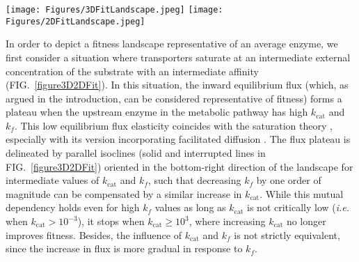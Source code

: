 \documentclass[11pt,onecolumn]{article}
\begin{document}
\begin{figure*}[t!]
\centering
\texttt{[image: Figures/3DFitLandscape.jpeg]}
\texttt{[image: Figures/2DFitLandscape.jpeg]}
\caption{The flux of product following substrate uptake by transporters and conversion by a dedicated enzyme depends on the kinetic parameters $k_f$ and $k_\text{cat}$ of the enzyme. This landscape is generic in the sense that we avoid focusing on sugars -- arguably extreme cases in terms of flux intensity -- for a general description, considering a moderate flux at saturation $V_{Tm}=1 \mu M.s^{-1}$ close to those measured for amino acids and nucleosides in E.\textit{coli} \citep{Zampieri2019}. We also set the transport saturation ratio $[S_\text{out}]/K_\text{T}$ to 10 such that the FD process approaches saturation, and high transporter affinity $K_\text{T}=50\mu M$, also in line with estimates for nucleosides \citep{Griffith96,Xie04} (see Material and Methods). Other parameter values include $k_r=10^3s^{-1}$ and $[E_{tot}]=1mM$. The color gradient shows the absolute and normalized (such that the maximum flux equals $1$) values of equilibrium flux.}
\label{figure3D2DFit}
\end{figure*}

In order to depict a fitness landscape representative of an average enzyme, we first consider a situation where transporters saturate at an intermediate external concentration of the substrate with an intermediate affinity (FIG.~\ref{figure3D2DFit}). In this situation, the inward equilibrium flux (which, as argued in the introduction, can be considered representative of fitness) forms a plateau when the upstream enzyme in the metabolic pathway has high $k_\text{cat}$ and $k_f$. This low equilibrium flux elasticity coincides with the saturation theory \citep{Wright34, Kacser73}, especially with its version incorporating facilitated diffusion \citep{Kuile94}. The flux plateau is delineated by parallel isoclines (solid and interrupted lines in FIG.~\ref{figure3D2DFit}) oriented in the bottom-right direction of the landscape for intermediate values of $k_\text{cat}$ and $k_f$, such that decreasing $k_f$ by one order of magnitude can be compensated by a similar increase in $k_\text{cat}$. While this mutual dependency holds even for high $k_f$ values as long as $k_\text{cat}$ is not critically low (\textit{i.e.} when $k_\text{cat}>10^{-3}$), it stops when $k_\text{cat}\geq 10^3$, where increasing $k_\text{cat}$ no longer improves fitness. 
Besides, the influence of $k_\text{cat}$ and $k_f$ is not strictly equivalent, since the increase in flux is more gradual in response to $k_f$. 
 
\end{document}
